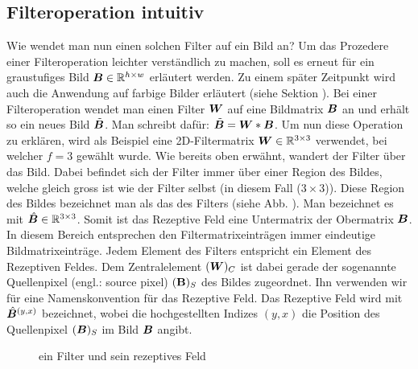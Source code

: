 \subsection{Filteroperation intuitiv}\label{sec:filteroperation_intuitiv}
Wie wendet man nun einen solchen Filter auf ein Bild an? Um das Prozedere einer
Filteroperation leichter verständlich zu machen, soll es erneut für ein
graustufiges Bild $\bm{B} \in \mathbb{R}^{h \times w}$ erläutert werden. Zu einem
später Zeitpunkt wird auch die Anwendung auf farbige
Bilder erläutert (siehe Sektion ).
\para{}
Bei einer Filteroperation wendet man einen Filter $\bm{W}$ auf eine Bildmatrix
$\bm{B}$ an und erhält so ein neues Bild $\tilde{\bm{B}}$. Man schreibt dafür:
$\tilde{\bm{B}} = \bm{W} * \bm{B}$.
\para{}
Um nun diese Operation zu erklären, wird als Beispiel eine
2D-Filtermatrix $\bm{W} \in \mathbb{R}^{3 \times 3}$ verwendet, bei welcher
$f = 3$ gewählt wurde.
Wie bereits oben erwähnt, wandert der Filter über das Bild. Dabei befindet
sich der Filter immer über einer Region des Bildes, welche gleich gross ist
wie der Filter selbst (in diesem Fall ($3 \times 3$)). Diese Region des Bildes
bezeichnet man als das  des Filters (siehe Abb.
). Man bezeichnet es mit $\hat{\bm{B}}
\in \mathbb{R}^{3 \times 3}$. Somit ist das Rezeptive Feld eine Untermatrix der Obermatrix $\bm{B}$.
\para{}
In diesem Bereich entsprechen den Filtermatrixeinträgen immer eindeutige Bildmatrixeinträge.
Jedem Element des Filters entspricht ein Element des Rezeptiven Feldes. Dem
Zentralelement $(\bm{W})_C$ ist dabei gerade der sogenannte Quellenpixel
(engl.: source pixel) $(\mathbf{B})_S$ des Bildes zugeordnet. Ihn verwenden wir für eine
Namenskonvention für das Rezeptive Feld. Das Rezeptive Feld wird mit
$\hat{\bm{B}}^{(y,x)}$ bezeichnet, wobei die hochgestellten Indizes $(y,x)$ die Position
des Quellenpixel $(\bm{B})_S$ im Bild $\bm{B}$ angibt.

\begin{figure}[h!]

  \caption{ein Filter und sein rezeptives Feld}
  \label{fig:receptive_field}
\end{figure}

